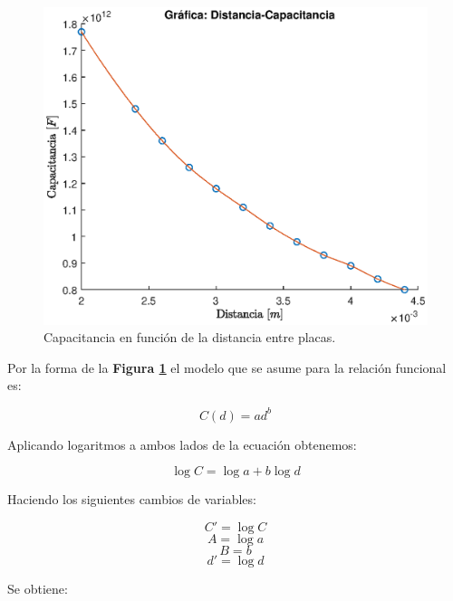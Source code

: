 \documentclass[letter,11pt]{article}
\begin{document}
\begin{figure}[!h]
\centering
\includegraphics[scale=1.00]{resources/m1.1.eps}
\caption{Capacitancia en función de la distancia entre placas.}
\label{figura4}
\end{figure}

Por la forma de la \textbf{Figura \ref{figura4}} el modelo que se asume para la
relación funcional es:

\begin{equation*}
    C(d) = a d^b
\end{equation*}

Aplicando logaritmos a ambos lados de la ecuación obtenemos:

\begin{equation*}
    \log C = \log a + b \log d
\end{equation*}

Haciendo los siguientes cambios de variables:

\begin{equation*}
    C' = \log C
\end{equation*}
\begin{equation*}
    A = \log a
\end{equation*}
\begin{equation*}
    B = b
\end{equation*}
\begin{equation*}
    d' = \log d
\end{equation*}

Se obtiene:
\end{document}
